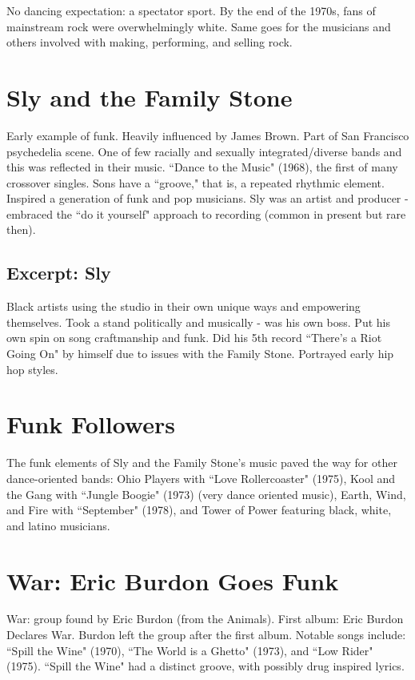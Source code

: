 \documentclass[12pt, a4paper, twoside, openright, titlepage]{book}
\begin{document}
No dancing expectation: a spectator sport. By the end of the 1970s, fans of mainstream rock were overwhelmingly white. Same goes for the musicians and others involved with making, performing, and selling rock. 


\section{Sly and the Family Stone}

Early example of funk. Heavily influenced by James Brown. Part of San Francisco psychedelia scene. One of few racially and sexually integrated/diverse bands and this was reflected in their music. ``Dance to the Music" (1968), the first of many crossover singles. Sons have a ``groove," that is, a repeated rhythmic element. Inspired a generation of funk and pop musicians. Sly was an artist and producer - embraced the ``do it yourself" approach to recording (common in present but rare then).

\subsection{Excerpt: Sly}

Black artists using the studio in their own unique ways and empowering themselves. Took a stand politically and musically - was his own boss. Put his own spin on song craftmanship and funk. Did his 5th record ``There's a Riot Going On" by himself due to issues with the Family Stone. Portrayed early hip hop styles.


\section{Funk Followers}

The funk elements of Sly and the Family Stone's music paved the way for other dance-oriented bands: Ohio Players with ``Love Rollercoaster" (1975), Kool and the Gang with ``Jungle Boogie" (1973) (very dance oriented music), Earth, Wind, and Fire with ``September" (1978), and Tower of Power featuring black, white, and latino musicians.



\section{War: Eric Burdon Goes Funk}

War: group found by Eric Burdon (from the Animals). First album: Eric Burdon Declares War. Burdon left the group after the first album. Notable songs include: ``Spill the Wine" (1970), ``The World is a Ghetto" (1973), and ``Low Rider" (1975). ``Spill the Wine" had a distinct groove, with possibly drug inspired lyrics.
\end{document}

